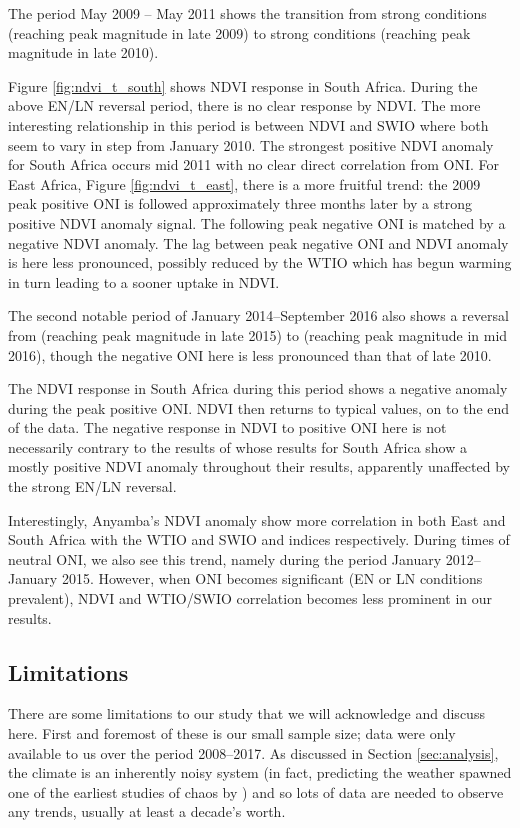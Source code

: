 The period May 2009 -- May 2011 shows the transition from strong \elnino{}
conditions (reaching peak magnitude in late 2009) to strong \nina{} conditions
(reaching peak magnitude in late 2010).

Figure \ref{fig:ndvi_t_south} shows NDVI response in South Africa. During the
above EN/LN reversal period, there is no clear response by NDVI. The more
interesting relationship in this period is between NDVI and SWIO where both seem
to vary in step from January 2010. The strongest positive NDVI anomaly for South
Africa occurs mid 2011 with no clear direct correlation from ONI. For East
Africa, Figure \ref{fig:ndvi_t_east}, there is a more fruitful trend: the 2009
peak positive ONI is followed approximately three months later by a strong
positive NDVI anomaly signal. The following peak negative ONI is matched by a
negative NDVI anomaly. The lag between peak negative ONI and NDVI anomaly is
here less pronounced, possibly reduced by the WTIO which has begun warming in
turn leading to a sooner uptake in NDVI.

The second notable period of January 2014--September 2016 also shows a reversal
from \elnino{} (reaching peak magnitude in late 2015) to \nina{} (reaching peak
magnitude in mid 2016), though the negative ONI here is less pronounced than
that of late 2010.

The NDVI response in South Africa during this period shows a negative anomaly
during the peak positive ONI. NDVI then returns to typical values, on to the end
of the data. The negative response in NDVI to positive ONI here is not
necessarily contrary to the results of \cite{anyamba2002} whose results for
South Africa show a mostly positive NDVI anomaly throughout their results,
apparently unaffected by the strong EN/LN reversal.

Interestingly, Anyamba's NDVI anomaly show more correlation in both East and
South Africa with the WTIO and SWIO and indices respectively. During times of
neutral ONI, we also see this trend, namely during the period January
2012--January 2015. However, when ONI becomes significant (EN or LN conditions
prevalent), NDVI and WTIO/SWIO correlation becomes less prominent in our
results.

\subsection{Limitations}
There are some limitations to our study that we will acknowledge and
discuss here. First and foremost of these is our small sample size;
data were only available to us over the period 2008--2017. As discussed
in Section \ref{sec:analysis}, the climate is an inherently noisy
system (in fact, predicting the weather spawned one of the earliest
studies of chaos by \cite{lorenz1963}) and so lots of data are needed
to observe any trends, usually at least a decade's worth.


